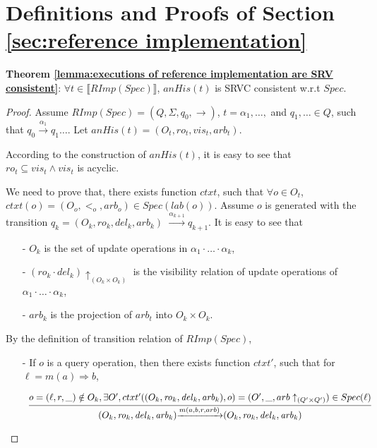\section{Definitions and Proofs of Section \ref{sec:reference implementation}}
\label{sec:appendix definitions and proofs of section reference implementation}

{\noindent \bf Theorem \ref{lemma:executions of reference implementation are SRV consistent}}: $\forall t \in \llbracket RImp(Spec) \rrbracket$, $anHis(t)$ is SRVC consistent w.r.t $Spec$.

\begin {proof}

Assume $RImp(Spec) = (Q,\Sigma,q_0,\rightarrow)$, $t = \alpha_1, \ldots, $ and $q_1,\ldots \in Q$, such that $q_0 {\xrightarrow{\alpha_1}} q_1 \ldots$. Let $anHis(t) = (O_t,\mathit{ro}_t,\mathit{vis}_t,\mathit{arb}_t)$.

According to the construction of $anHis(t)$, it is easy to see that $\mathit{ro}_t \subseteq \mathit{vis}_t \wedge \mathit{vis}_t$ is acyclic.

We need to prove that, there exists function $ctxt$, such that $\forall o \in O_t$, $ctxt(o) = (O_o,<_o,arb_o) \in Spec(lab(o))$. Assume $o$ is generated with the transition $q_k = (O_k,\mathit{ro}_k,\mathit{del}_k,\mathit{arb}_k)$ ${\xrightarrow{\alpha_{k+1}}} q_{k+1}$. It is easy to see that

\begin{itemize}
\setlength{\itemsep}{0.5pt}
\item[-] $O_k$ is the set of update operations in $\alpha_1 \cdot \ldots \cdot \alpha_k$,

\item[-] $(\mathit{ro}_k \cdot \mathit{del}_k) \uparrow_{ (O_k \times O_k) }$ is the visibility relation of update operations of $\alpha_1 \cdot \ldots \cdot \alpha_k$,

\item[-] $\mathit{arb}_k$ is the projection of $arb_t$ into $O_k \times O_k$.
\end{itemize}

By the definition of transition relation of $RImp(Spec)$,

\begin{itemize}
\setlength{\itemsep}{0.5pt}
\item[-] If $o$ is a query operation, then there exists function $ctxt'$, such that for $\ell = m(a) \Rightarrow b$,

     $\begin{array}{l c} \bigfrac{ o=(\ell,r,\_) \notin O_k, \exists O', ctxt'((O_k,\mathit{ro}_k,\mathit{del}_k,\mathit{arb}_k),o) = (O',\_,arb \uparrow_{ (Q' \times Q') })  \in Spec(\ell)} {(O_k,\mathit{ro}_k,\mathit{del}_k,\mathit{arb}_k) {\xrightarrow{m(a,b,r,arb)}} (O_k,\mathit{ro}_k,\mathit{del}_k,\mathit{arb}_k)}  \end{array}$


\end{itemize}
\end{proof}
